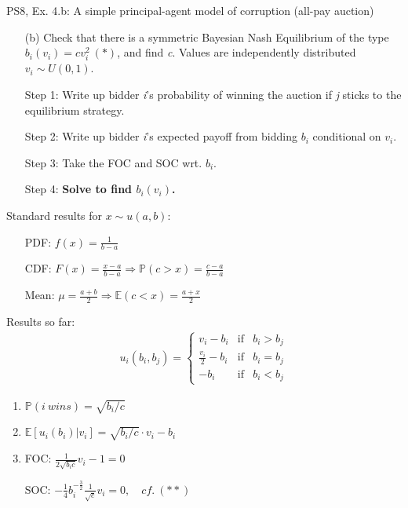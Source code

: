 \begin{frame}{PS8, Ex. 4.b: A simple principal-agent model of corruption (all-pay auction)}
    \begin{itemize}
      \item[(b)] Check that there is a symmetric Bayesian Nash Equilibrium of the type $b_i(v_i) = cv_i^2\ (*)$, and find \textit{c}. Values are independently distributed $v_i\sim U(0, 1)$.
    \end{itemize} \vspace{-8pt}
    \begin{multicols}{2}
      \begin{itemize}
        \item[Step 1:] Write up bidder \textit{i}'s probability of winning the auction if \textit{j} sticks to the equilibrium strategy.
        \item[Step 2:] Write up bidder \textit{i}'s expected payoff from bidding $b_i$ conditional on $v_i$.
        \item[Step 3:] Take the FOC and SOC wrt. $b_i$.
        \item[Step 4:] \textbf{Solve to find $b_i(v_i)$.}
      \end{itemize} \vspace{-8pt}
      \vfill\null\columnbreak
      Standard results for $x\sim u(a, b):$ \vspace{-6pt}
      \begin{itemize}
        \item[PDF:] $f(x)=\frac{1}{b-a}$
        \item[CDF:] $F(x)=\frac{x-a}{b-a}\Rightarrow\mathbb{P}(c>x)=\frac{c-a}{b-a}$
        \item[Mean:] $\mu=\frac{a+b}{2}\Rightarrow\mathbb{E}(c<x)=\frac{a+x}{2}$
      \end{itemize}
      \vspace{-6pt}
      Results so far: \vspace{-6pt}
      \begin{align*}
        u_i(b_i,b_j)=\left\{\begin{array}{lcl}
          v_i-b_i           & \text{if} & b_i>b_j \\
          \frac{v_i}{2}-b_i & \text{if} & b_i=b_j \\
          -b_i              & \text{if} & b_i<b_j
        \end{array}\right.
      \end{align*} \vspace{-16pt}
      \begin{enumerate}
        \item $\mathbb{P}(i\ wins)=\sqrt{b_i/c}$
        \item $\mathbb{E}[u_i(b_i)|v_i]=\sqrt{b_i/c}\cdot v_i-b_i$
        \item FOC: $\frac{1}{2\sqrt{b_ic}}v_i-1=0$
        \item[] SOC: $-\frac{1}{4}b_i^{-\frac{3}{2}}\frac{1}{\sqrt{c}}v_i=0,\quad cf.\ (**)$
      \end{enumerate}
      \vfill\null
    \end{multicols}
\end{frame}
